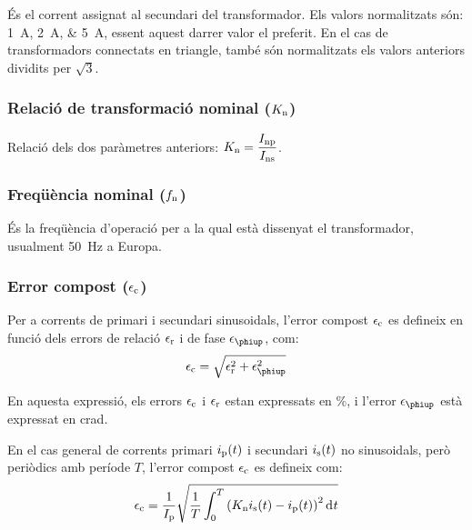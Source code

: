  És el corrent assignat al
secundari del transformador. Els valors normalitzats
són: \SIlist{1;2;5}{A}, essent aquest darrer valor el
preferit. En el cas de transformadors connectats en triangle, també són normalitzats els valors anteriors dividits per $ \sqrt{3}$.

\subsubsection{Relació de transformació nominal ($K_\mathrm{n}$)}

Relació dels dos  paràmetres anteriors: $K_\mathrm{n} = \dfrac{I_\mathrm{np}}{I_\mathrm{ns}}$.

\subsubsection{Freqüència nominal ($f_\mathrm{n}$)}

 És la freqüència d'operació per a la qual    està dissenyat el transformador, usualment \SI{50}{Hz} a Europa.

\subsubsection{Error compost ($\epsilon_\mathrm{c}$)}

Per a corrents de primari i secundari sinusoidals, l'error compost $\epsilon_\mathrm{c}$ es defineix  en funció dels errors de relació $\epsilon_\mathrm{r}$ i de fase  $\epsilon\ped{\phiup}$, com:
\begin{equation}
    \epsilon\ped{c} = \sqrt{\epsilon\ped{r}^2 +  \epsilon\ped{\phiup}^2}
\end{equation}

En aquesta expressió, els errors $\epsilon_\mathrm{c}$ i $\epsilon_\mathrm{r}$  estan expressats en \si{\percent}, i l'error $\epsilon\ped{\phiup}$ està expressat en crad.

En el cas general de corrents primari $i_\mathrm{p}(t)$ i secundari $i_\mathrm{s}(t)$ no sinusoidals, però periòdics amb període $T$, l'error compost $\epsilon_\mathrm{c}$ es defineix com:
\begin{equation}
    \epsilon\ped{c} = \frac{1}{I\ped{p}} \sqrt{\frac{1}{T} \int_0^T \left(K\ped{n} i\ped{s}(t) - i\ped{p}(t)\right)^2 \diff t}
\end{equation}

